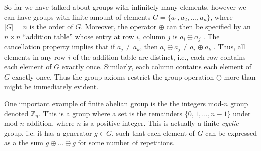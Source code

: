 \documentclass{Resources/UoBLab1}
\theoremstyle{definition}
\begin{document}
So far we have talked about groups with infinitely many elements, however we can have groups with finite amount of elements $G = \{a_1 , a_2, ..., a_n\}$, where $|G| = n$ is the order of $G$. Moreover, the operator $\oplus$ can then be specified by an $n \times n$ “addition table” whose entry at row $i$, column $j$ is $a_i \oplus a_j$ . The cancellation property implies that if $a_j \ne a_k$, then $a_i \oplus a_j \ne a_i \oplus a_k$ . Thus, all elements in any row $i$ of the addition table are distinct, i.e., each row contains each element of $G$ exactly once. Similarly, each column contains each element of $G$ exactly once. Thus the group axioms restrict the group operation $\oplus$ more than might be immediately evident.

One important example of finite abelian group is the the integers mod-$n$ group denoted $\mathbb{Z}_n$. This is a group where a set is the remainders $\{0, 1, ..., n - 1\}$ under mod-$n$ addition, where $n$ is a positive integer. This is actually a finite \textit{cyclic} group, i.e. it has a generator $g \in G$, such that each element of $G$ can be expressed as a the sum $g\oplus ... \oplus g$ for some number of repetitions.
\end{document}
